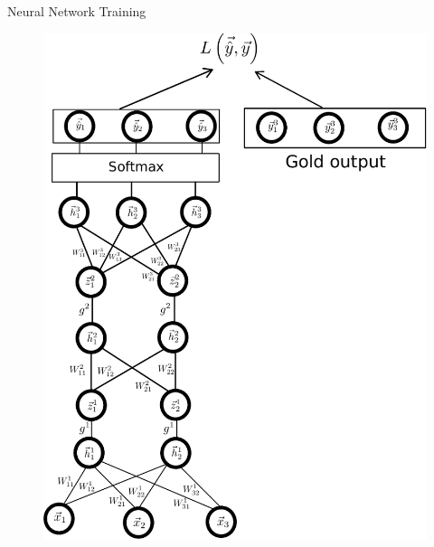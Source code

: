 \documentclass[handout]{beamer}
\begin{document}
\begin{frame}{Neural Network Training}
\begin{figure}[htb]
	\centering
	 \includegraphics[scale=0.41]{pics/neural_net.pdf}
\end{figure}
\end{frame}
\end{document}

